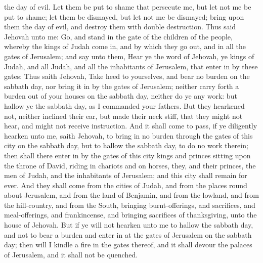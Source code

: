 the day of evil. Let them be put to shame that persecute me, but let not me be put to shame; let them be dismayed, but let not me be dismayed; bring upon them the day of evil, and destroy them with double destruction.  Thus said Jehovah unto me: Go, and stand in the gate of the children of the people, whereby the kings of Judah come in, and by which they go out, and in all the gates of Jerusalem; and say unto them, Hear ye the word of Jehovah, ye kings of Judah, and all Judah, and all the inhabitants of Jerusalem, that enter in by these gates: Thus saith Jehovah, Take heed to yourselves, and bear no burden on the sabbath day, nor bring it in by the gates of Jerusalem; neither carry forth a burden out of your houses on the sabbath day, neither do ye any work: but hallow ye the sabbath day, as I commanded your fathers. But they hearkened not, neither inclined their ear, but made their neck stiff, that they might not hear, and might not receive instruction.  And it shall come to pass, if ye diligently hearken unto me, saith Jehovah, to bring in no burden through the gates of this city on the sabbath day, but to hallow the sabbath day, to do no work therein; then shall there enter in by the gates of this city kings and princes sitting upon the throne of David, riding in chariots and on horses, they, and their princes, the men of Judah, and the inhabitants of Jerusalem; and this city shall remain for ever. And they shall come from the cities of Judah, and from the places round about Jerusalem, and from the land of Benjamin, and from the lowland, and from the hill-country, and from the South, bringing burnt-offerings, and sacrifices, and meal-offerings, and frankincense, and bringing sacrifices of thanksgiving, unto the house of Jehovah. But if ye will not hearken unto me to hallow the sabbath day, and not to bear a burden and enter in at the gates of Jerusalem on the sabbath day; then will I kindle a fire in the gates thereof, and it shall devour the palaces of Jerusalem, and it shall not be quenched. 

